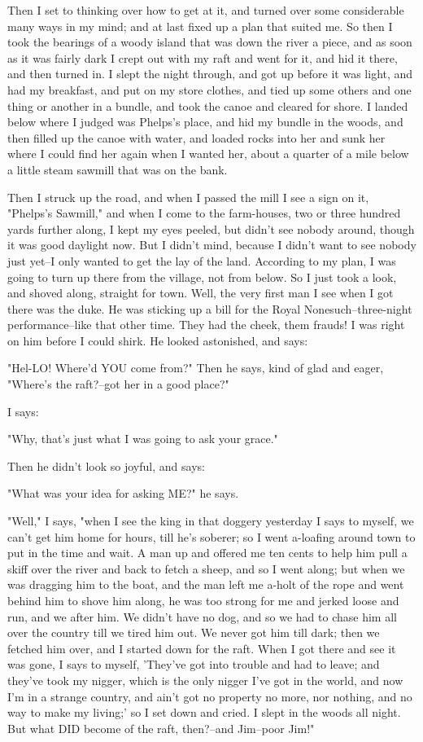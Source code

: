 Then I set to thinking over how to get at it, and turned over some
considerable many ways in my mind; and at last fixed up a plan that
suited me.  So then I took the bearings of a woody island that was down
the river a piece, and as soon as it was fairly dark I crept out with my
raft and went for it, and hid it there, and then turned in.  I slept the
night through, and got up before it was light, and had my breakfast, and
put on my store clothes, and tied up some others and one thing or another
in a bundle, and took the canoe and cleared for shore.  I landed below
where I judged was Phelps's place, and hid my bundle in the woods, and
then filled up the canoe with water, and loaded rocks into her and sunk
her where I could find her again when I wanted her, about a quarter of a
mile below a little steam sawmill that was on the bank.

Then I struck up the road, and when I passed the mill I see a sign on it,
"Phelps's Sawmill," and when I come to the farm-houses, two or three
hundred yards further along, I kept my eyes peeled, but didn't see nobody
around, though it was good daylight now.  But I didn't mind, because I
didn't want to see nobody just yet--I only wanted to get the lay of the
land. According to my plan, I was going to turn up there from the
village, not from below.  So I just took a look, and shoved along,
straight for town. Well, the very first man I see when I got there was
the duke.  He was sticking up a bill for the Royal Nonesuch--three-night
performance--like that other time.  They had the cheek, them frauds!  I
was right on him before I could shirk.  He looked astonished, and says:

"Hel-LO!  Where'd YOU come from?"  Then he says, kind of glad and eager,
"Where's the raft?--got her in a good place?"

I says:

"Why, that's just what I was going to ask your grace."

Then he didn't look so joyful, and says:

"What was your idea for asking ME?" he says.

"Well," I says, "when I see the king in that doggery yesterday I says to
myself, we can't get him home for hours, till he's soberer; so I went
a-loafing around town to put in the time and wait.  A man up and offered
me ten cents to help him pull a skiff over the river and back to fetch a
sheep, and so I went along; but when we was dragging him to the boat, and
the man left me a-holt of the rope and went behind him to shove him
along, he was too strong for me and jerked loose and run, and we after
him.  We didn't have no dog, and so we had to chase him all over the
country till we tired him out.  We never got him till dark; then we
fetched him over, and I started down for the raft.  When I got there and
see it was gone, I says to myself, 'They've got into trouble and had to
leave; and they've took my nigger, which is the only nigger I've got in
the world, and now I'm in a strange country, and ain't got no property no
more, nor nothing, and no way to make my living;' so I set down and
cried.  I slept in the woods all night.  But what DID become of the raft,
then?--and Jim--poor Jim!"

